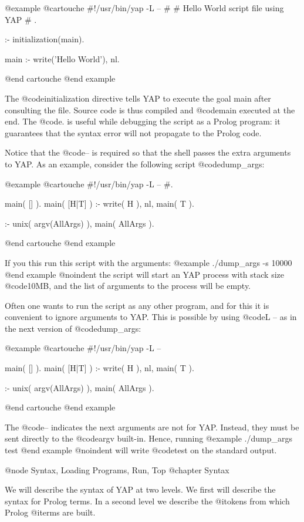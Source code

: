 {@example
@cartouche
#!/usr/bin/yap -L --
#
# Hello World script file using YAP
# .

:- initialization(main).

main :- write('Hello World'), nl.

@end cartouche
@end example

The @code{initialization} directive tells YAP to execute the goal main
after consulting the file. Source code is thus compiled and @code{main}
executed at the end. The @code{.} is useful while debugging the script
as a Prolog program: it guarantees that the syntax error will not
propagate to the Prolog code.

Notice that the @code{--} is required so that the shell passes the extra
arguments to YAP.  As an example, consider the following script
@code{dump_args}:

@example
@cartouche
#!/usr/bin/yap -L --
#.

main( [] ).
main( [H|T] ) :-
        write( H ), nl,
        main( T ).

:- unix( argv(AllArgs) ), main( AllArgs ).

@end cartouche
@end example

If you this run this script with the arguments:
@example
./dump_args -s 10000
@end example
@noindent
the script will start an YAP process with stack size @code{10MB}, and
the list of arguments to the process will be empty.

Often one wants to run the script as any other program, and for this it
is convenient to ignore arguments to YAP. This is possible by using
@code{L --} as in the next version of @code{dump_args}:

@example
@cartouche
#!/usr/bin/yap -L --

main( [] ).
main( [H|T] ) :-
        write( H ), nl,
        main( T ).

:- unix( argv(AllArgs) ), main( AllArgs ).

@end cartouche
@end example

The @code{--} indicates the next arguments are not for YAP. Instead,
they must be sent directly to the @code{argv} built-in. Hence, running
@example
./dump_args test
@end example
@noindent
will write @code{test} on the standard output.


@node Syntax, Loading Programs, Run, Top
@chapter Syntax

We will describe the syntax of YAP at two levels. We first will
describe the syntax for Prolog terms. In a second level we describe
the @i{tokens} from which Prolog @i{terms} are
built.

}

